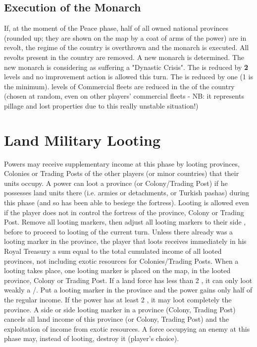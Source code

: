 \subsection{Execution of the
  Monarch}\label{chRedep:ExecutionMonarchByRevolts}
\aparag If, at the moment of the Peace phase, half of all owned national
provinces (rounded up; they are shown on the map by a coat of arms of the
power) are in revolt, the regime of the country is overthrown and the monarch
is executed.
\aparag[Consequences]
All revolts present in the country are removed. A new monarch is
determined. The new monarch is considering as suffering a "Dynastic Crisis".
\bparag The \STAB is reduced by \textbf{2} levels%
and no \STAB improvement action is allowed this turn.
\bparag The \DTI is reduced by one (1 is the minimum).
 levels of Commercial fleets are reduced in the \CTZ of the country
(chosen at random, even on other players' commercial fleets - NB: it
represents pillage and lost properties due to this really unstable situation!)



\section{Land Military Looting}

Powers may receive supplementary income at this phase by looting provinces,
Colonies or Trading Posts of the other players (or minor countries) that their
units occupy.
\aparag A power can loot a province (or Colony/Trading Post) if he possesses
land units there (i.e. armies or detachments, or Turkish pashas) during this
phase (and so has been able to besiege the fortress).  Looting is allowed even
if the player does not in control the fortress of the province, Colony or
Trading Post.
Remove all \Facemoins looting markers, then adjust all \Faceplus looting
markers to their side \Facemoins, before to proceed to looting of the current
turn.
Unless there already was a looting marker in the province, the player that
loots receives immediately in his Royal Treasury a sum equal to the total
cumulated income of all looted provinces, not including exotic resources for
Colonies/Trading Posts.
When a looting takes place, one looting marker \Faceplus is placed on the map,
in the looted province, Colony or Trading Post.
If a land force has less than 2 \LD, it can only loot weakly a \COL/\TP.  Put
a \Facemoins looting marker in the province and the power gains only half of
the regular income.  If the power has at least 2 \LD, it may loot completely
the province.
A side \Faceplus or side \Facemoins looting marker in a province (Colony,
Trading Post) cancels all land income of this province (or Colony, Trading
Post) and the exploitation of income from exotic resources.
A force occupying an enemy \TP at this phase may, instead of looting, destroy
it (player's choice).



